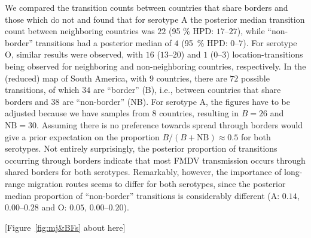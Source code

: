 \documentclass[10pt]{article}
\begin{document}
We compared the transition counts between countries that share borders and those which do not and found that for serotype A the posterior median transition count between neighboring countries was $22$ (95 \% HPD: $17$--$27$), 
while ``non-border'' transitions had a posterior median of $4$ (95~\% HPD: $0$--$7$).
For serotype O, similar results were observed, with $16$ ($13$--$20$) and $1$ ($0$--$3$) location-transitions being observed for neighboring and non-neighboring countries, respectively.
In the (reduced) map of South America, with  9 countries, there are $72$ possible transitions, of which $34$ are ``border'' (B), i.e., between countries that share borders and $38$ are ``non-border'' (NB).
For serotype A, the figures have to be adjusted because we have samples from $8$ countries, resulting in $B = 26$ and $ \text{NB} = 30$.
Assuming there is no preference towards spread through borders would give a prior expectation on the proportion $B/(B + \text{NB})\approx 0.5$ for both serotypes. 
Not entirely surprisingly, the posterior proportion of transitions occurring through borders indicate that most FMDV transmission occurs through shared borders for both serotypes.
Remarkably, however, the importance of long-range migration routes seems to differ for both serotypes, since the posterior median proportion of ``non-border'' transitions is considerably different (A: $0.14$, $0.00$--$0.28$  and O: $0.05$, $0.00$--$0.20$).

\begin{center}
 [Figure~\ref{fig:mj&BFs} about here]
\end{center}
\end{document}

